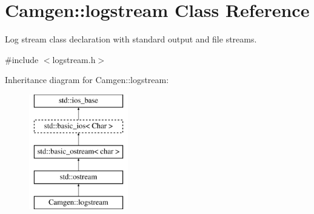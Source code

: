 \hypertarget{a00330}{}\section{Camgen\+:\+:logstream Class Reference}
\label{a00330}


Log stream class declaration with standard output and file streams.  




{\ttfamily \#include $<$logstream.\+h$>$}

Inheritance diagram for Camgen\+:\+:logstream\+:\begin{figure}[H]
\begin{center}
\leavevmode
\includegraphics[height=5.000000cm]{a00330}
\end{center}
\end{figure}
